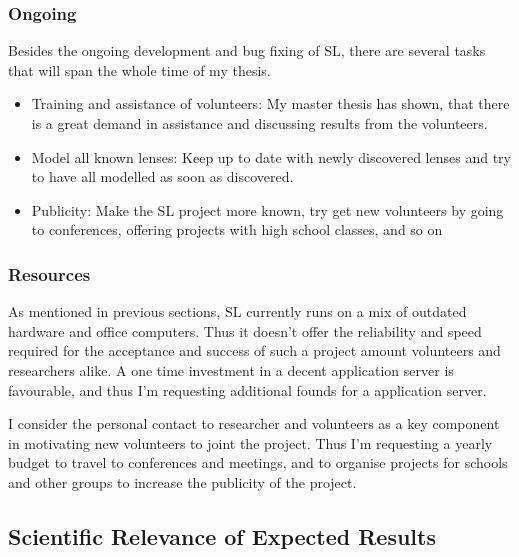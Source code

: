 \documentclass[11pt]{article}
\begin{document}
\subsubsection{Ongoing}
\label{sec:ongoing}

Besides the ongoing development and bug fixing of SL, there are several tasks that will span the whole time of my thesis.

\begin{itemize}
  \item Training and assistance of volunteers: My master thesis has shown, that there is a great demand in assistance and discussing results from the volunteers.
  \item Model all known lenses: Keep up to date with newly discovered lenses and try to have all modelled as soon as discovered.
  \item Publicity: Make the SL project more known, try get new volunteers by going to conferences, offering projects with high school classes, and so on
\end{itemize}


\subsubsection{Resources}

As mentioned in previous sections, SL currently runs on a mix of outdated hardware and office computers.
Thus it doesn't offer the reliability and speed required for the acceptance and success of such a project amount volunteers and researchers alike.
A one time investment in a decent application server is favourable, and thus I'm requesting additional founds for a application server.

I consider the personal contact to researcher and volunteers as a key component in motivating new volunteers to joint the project.
Thus I'm requesting a yearly budget to travel to conferences and meetings, and to organise projects for schools and other groups to increase the publicity of the project.



\subsection{Scientific Relevance of Expected Results}






\end{document}
